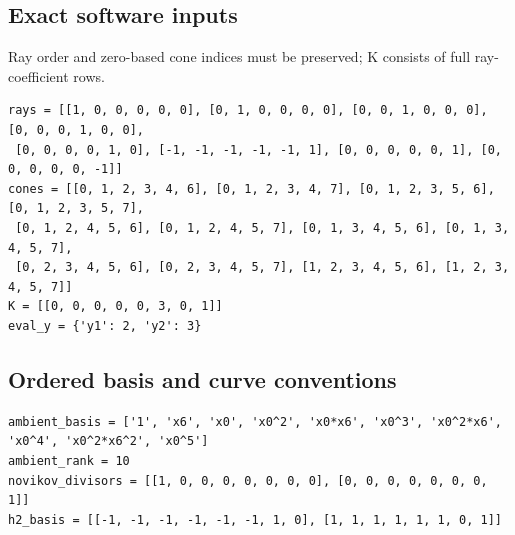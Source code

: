 \documentclass[10pt,a4paper]{article}
\begin{document}
\subsection*{Exact software inputs}
Ray order and zero-based cone indices must be preserved; K consists of full ray-coefficient rows.
\begin{lstlisting}
rays = [[1, 0, 0, 0, 0, 0], [0, 1, 0, 0, 0, 0], [0, 0, 1, 0, 0, 0], [0, 0, 0, 1, 0, 0],
 [0, 0, 0, 0, 1, 0], [-1, -1, -1, -1, -1, 1], [0, 0, 0, 0, 0, 1], [0, 0, 0, 0, 0, -1]]
cones = [[0, 1, 2, 3, 4, 6], [0, 1, 2, 3, 4, 7], [0, 1, 2, 3, 5, 6], [0, 1, 2, 3, 5, 7],
 [0, 1, 2, 4, 5, 6], [0, 1, 2, 4, 5, 7], [0, 1, 3, 4, 5, 6], [0, 1, 3, 4, 5, 7],
 [0, 2, 3, 4, 5, 6], [0, 2, 3, 4, 5, 7], [1, 2, 3, 4, 5, 6], [1, 2, 3, 4, 5, 7]]
K = [[0, 0, 0, 0, 0, 3, 0, 1]]
eval_y = {'y1': 2, 'y2': 3}
\end{lstlisting}
\subsection*{Ordered basis and curve conventions}
\begin{lstlisting}
ambient_basis = ['1', 'x6', 'x0', 'x0^2', 'x0*x6', 'x0^3', 'x0^2*x6', 'x0^4', 'x0^2*x6^2', 'x0^5']
ambient_rank = 10
novikov_divisors = [[1, 0, 0, 0, 0, 0, 0, 0], [0, 0, 0, 0, 0, 0, 0, 1]]
h2_basis = [[-1, -1, -1, -1, -1, -1, 1, 0], [1, 1, 1, 1, 1, 1, 0, 1]]
\end{lstlisting}
\end{document}
